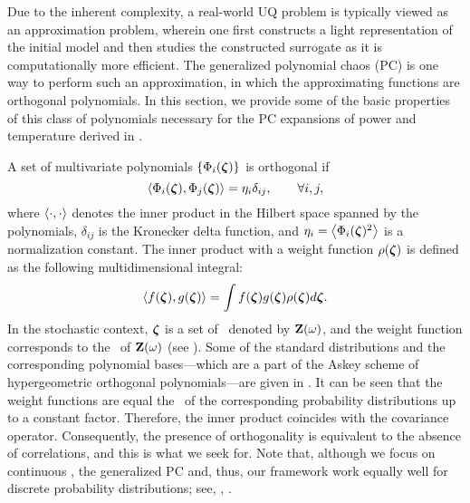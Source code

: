 
Due to the inherent complexity, a real-world UQ problem is typically viewed as an approximation problem, wherein one first constructs a light representation of the initial model and then studies the constructed surrogate as it is computationally more efficient. The generalized polynomial chaos (PC) \cite{xiu2010} is one way to perform such an approximation, in which the approximating functions are orthogonal polynomials. In this section, we provide some of the basic properties \cite{xiu2010, maitre2010} of this class of polynomials necessary for the PC expansions of power and temperature derived in .

A set of multivariate polynomials $\{ \Phi_i(\boldsymbol{\zeta}) \}$ is orthogonal if
\begin{equation} \elabel{orthogonality}
  \oInner{\pcb_i(\vz)}{\pcb_j(\vz)} = \pcn_i \delta_{ij}, \qquad \forall i, j,
\end{equation}
where $\oInner{\idot}{\idot}$ denotes the inner product in the Hilbert space spanned by the polynomials, $\delta_{ij}$ is the Kronecker delta function, and $\pcn_i = \oInner{\pcb_i(\vz)^2}$ is a normalization constant. The inner product with a weight function $\rho(\boldsymbol{\zeta})$ is defined as the following multidimensional integral:
\begin{equation} \elabel{inner-product}
  \oInner{f(\vz)}{g(\vz)} = \int f(\vz) g(\vz) \PDF(\vz) d\vz.
\end{equation}
In the stochastic context, $\boldsymbol{\zeta}$ is a set of \rvs\ denoted by $\mathbf{Z}(\omega)$, and the weight function corresponds to the \pdf\ of $\mathbf{Z}(\omega)$ (see ). Some of the standard distributions and the corresponding polynomial bases---which are a part of the Askey scheme \cite{xiu2010} of hypergeometric orthogonal polynomials---are given in . It can be seen that the weight functions are equal the \pdfs\ of the corresponding probability distributions up to a constant factor. Therefore, the inner product coincides with the covariance operator. Consequently, the presence of orthogonality is equivalent to the absence of correlations, and this is what we seek for. Note that, although we focus on continuous \rvs, the generalized PC and, thus, our framework work equally well for discrete probability distributions; see, \eg, \cite{xiu2010, maitre2010}.

